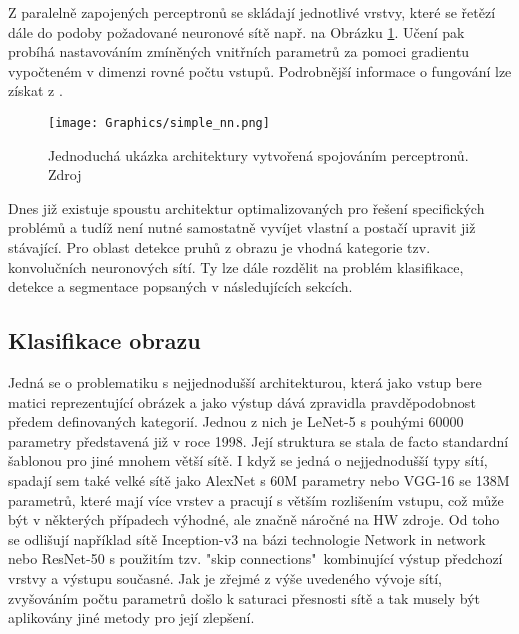 \documentclass[czech, bc, kky, he, iso690numb]{fasthesis}
\begin{document}
            Z paralelně zapojených perceptronů se skládají jednotlivé vrstvy, které se řetězí dále do podoby požadované neuronové sítě např. na Obrázku \ref{pic:basic_nn}. Učení pak probíhá nastavováním zmíněných vnitřních parametrů za pomoci gradientu vypočteném v dimenzi rovné počtu vstupů. Podrobnější informace o fungování lze získat z \cite{neural_networks_background_01,neural_networks_background_02}.
            
	            \begin{figure}[h]
	            	\centering
	            	\texttt{[image: Graphics/simple\_nn.png]}
	            	\caption{Jednoduchá ukázka architektury vytvořená spojováním perceptronů. Zdroj \cite{neural_networks_background_02}}
	            	\label{pic:basic_nn}
	            \end{figure}
            
           	Dnes již existuje spoustu architektur optimalizovaných pro řešení specifických problémů a tudíž není nutné samostatně vyvíjet vlastní a postačí upravit již stávající. Pro oblast detekce pruhů z obrazu je vhodná kategorie tzv. konvolučních neuronových sítí. Ty lze dále rozdělit na problém klasifikace, detekce a segmentace popsaných v následujících sekcích.
           	
           	\subsection{Klasifikace obrazu} \label{subsec:klasifikace_obrazu}
           		Jedná se o problematiku s nejjednodušší architekturou, která jako vstup bere matici reprezentující obrázek a jako výstup dává zpravidla pravděpodobnost předem definovaných kategorií. Jednou z nich je LeNet-5 \cite{LeNet-5} s pouhými 60000 parametry představená již v roce 1998. Její struktura se stala de facto standardní šablonou pro jiné mnohem větší sítě. I když se jedná o nejjednodušší typy sítí, spadají sem také velké sítě jako AlexNet \cite{ImageNet} s 60M parametry nebo VGG-16 \cite{VGG-16} se 138M parametrů, které mají více vrstev a pracují s větším rozlišením vstupu, což může být v některých případech výhodné, ale značně náročné na HW zdroje. Od toho se odlišují například sítě Inception-v3 \cite{Inception-v3} na bázi technologie Network in network \cite{Network_in_network} nebo ResNet-50 \cite{ResNet-50} s použitím tzv. "skip connections"\  kombinující výstup předchozí vrstvy a výstupu současné. Jak je zřejmé z výše uvedeného vývoje sítí, zvyšováním počtu parametrů došlo k saturaci přesnosti sítě a tak musely být aplikovány jiné metody pro její zlepšení.
           	
\end{document}
